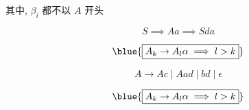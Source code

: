 \begin{frame}{}
  \begin{center}
    
    其中, $\beta_{i}$ 都不以 $A$ 开头

    \vspace{0.30cm}
    
  \end{center}
\end{frame}

\begin{frame}{}
  

  \pause
  
\end{frame}

\begin{frame}{}
  \begin{center}

    \vspace{-0.30cm}
    

    \vspace{-0.30cm}
    \[
      S \implies Aa \implies Sda
    \]

    \pause

    \vspace{-1.00cm}
    \[
      \blue{\boxed{A_{k} \to A_{l} \alpha \implies l > k}}
    \]
  \end{center}
\end{frame}

\begin{frame}{}
  

  \[
    A \to Ac \mid Aad \mid bd \mid \epsilon
  \]

  

  \vspace{0.30cm}
  \[
      \blue{\boxed{A_{k} \to A_{l} \alpha \implies l > k}}
  \]
\end{frame}


